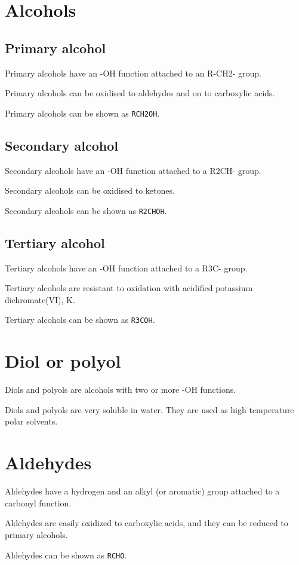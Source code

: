 \documentclass[oneside]{book} %
\theoremstyle{plain}
\begin{document}
\section{Alcohols}
\subsection{Primary alcohol}
Primary alcohols have an -OH function attached to an R-CH2- group.

Primary alcohols can be oxidised to aldehydes and on to carboxylic acids.

Primary alcohols can be shown as \texttt{RCH2OH}.

\subsection{Secondary alcohol}
Secondary alcohols have an -OH function attached to a R2CH- group.

Secondary alcohols can be oxidised to ketones.

Secondary alcohols can be shown as \texttt{R2CHOH}.

\subsection{Tertiary alcohol}
Tertiary alcohols have an -OH function attached to a R3C- group.

Tertiary alcohols are resistant to oxidation with acidified potassium
dichromate(VI), K.

Tertiary alcohols can be shown as \texttt{R3COH}.

\section{Diol or polyol}
Diols and polyols are alcohols with two or more -OH functions.

Diols and polyols are very soluble in water. They are used as high temperature
polar solvents.

\section{Aldehydes}
Aldehydes have a hydrogen and an alkyl (or aromatic) group attached to a
carbonyl function.

Aldehydes are easily oxidized to carboxylic acids, and they can be reduced to
primary alcohols.

Aldehydes can be shown as \texttt{RCHO}.
\end{document}
